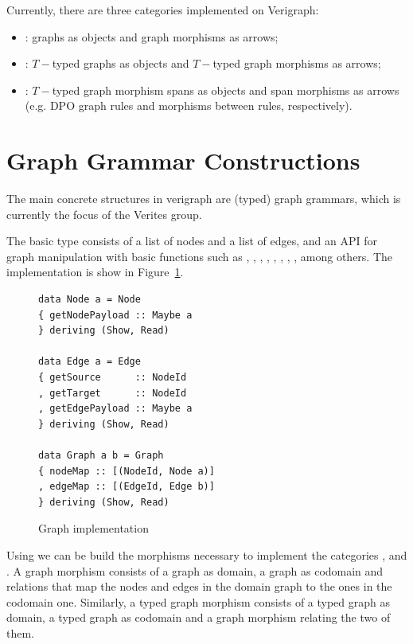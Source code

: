 Currently, there are three categories implemented on Verigraph: 

\begin{itemize}
  \item {}: graphs as objects and graph morphisms as arrows; 
  \item {}: $T-$typed graphs as objects and $T-$typed graph morphisms as arrows; 
  \item {}: $T-$typed graph morphism spans as objects and span morphisms as arrows (e.g. DPO graph rules and morphisms between rules, respectively).
\end{itemize}

\section{Graph Grammar Constructions}

The main concrete structures in verigraph are (typed) graph grammars, which is currently the focus of the Verites group. 

The basic  type consists of a list of nodes and a list of edges, and an API for graph manipulation with basic functions such as , , , , , , , , among others. The  implementation is show in Figure~\ref{fig:verigraph:graph}.

\begin{figure}[!ht]

\caption{Graph implementation}
\begin{verbatim}
data Node a = Node 
{ getNodePayload :: Maybe a
} deriving (Show, Read)

data Edge a = Edge 
{ getSource      :: NodeId
, getTarget      :: NodeId
, getEdgePayload :: Maybe a
} deriving (Show, Read)

data Graph a b = Graph 
{ nodeMap :: [(NodeId, Node a)]
, edgeMap :: [(EdgeId, Edge b)]
} deriving (Show, Read)
\end{verbatim}
\label{fig:verigraph:graph}
\end{figure}

Using  we can be build the morphisms necessary to implement the categories ,  and . A graph morphism consists of a graph as domain, a graph as codomain and relations that map the nodes and edges in the domain graph to the ones in the codomain one. Similarly, a typed graph morphism consists of a typed graph as domain, a typed graph as codomain and a graph morphism relating the two of them.

